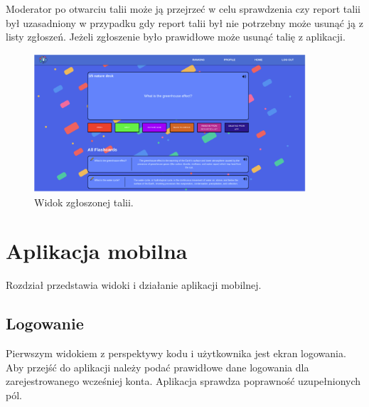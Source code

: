 Moderator po otwarciu talii może ją przejrzeć w celu sprawdzenia czy report talii był uzasadniony w przypadku gdy report talii był nie potrzebny może usunąć ją z listy zgłoszeń. Jeżeli zgłoszenie było prawidłowe może usunąć talię z aplikacji.


\begin{figure}[H]
    \centering
    \includegraphics[width=0.9\textwidth]{chapters/chapter_10/images_web/web_reported_deck_2}
    \caption{Widok zgłoszonej talii.}
    \label{img:web_reported_deck_2}
\end{figure}

\newpage
\section{Aplikacja mobilna}
Rozdział przedstawia widoki i działanie aplikacji mobilnej. 


\subsection{Logowanie}
Pierwszym widokiem z perspektywy kodu i użytkownika jest ekran logowania. Aby przejść do aplikacji należy podać prawidłowe dane logowania dla zarejestrowanego wcześniej konta. Aplikacja sprawdza poprawność uzupełnionych pól.


